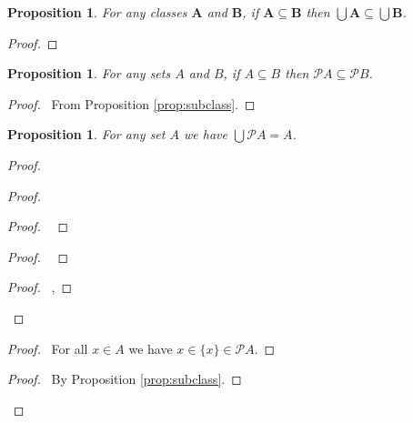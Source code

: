 \documentclass{book}
\let\qed\relax
\newtheorem{prop}[ax]{Proposition}
\theoremstyle{definition}
\begin{document}
\begin{prop}
\label{prop:unionmonotone}
For any classes $\mathbf{A}$ and $\mathbf{B}$, if $\mathbf{A} \subseteq \mathbf{B}$ then $\bigcup \mathbf{A} \subseteq \bigcup \mathbf{B}$.
\end{prop}

\begin{proof}
	\pf
	\qed
\end{proof}

\begin{prop}
\label{prop:powermonotone}
For any sets $A$ and $B$, if $A \subseteq B$ then $\mathcal{P} A \subseteq \mathcal{P} B$.
\end{prop}

\begin{proof}
\pf\ From Proposition \ref{prop:subclass}. \qed
\end{proof}

\begin{prop}
\label{prop:UPA}
For any set $A$ we have $\bigcup \mathcal{P} A = A$.
\end{prop}

\begin{proof}
\pf
{}
\begin{proof}
	\begin{proof}
		\pf\ 
	\end{proof}
	\begin{proof}
		\pf\ 
	\end{proof}
	\begin{proof}
		\pf\ , 
	\end{proof}
\end{proof}
\begin{proof}
	\pf\ For all $x \in A$ we have $x \in \{x\} \in \mathcal{P} A$.
\end{proof}
\qedstep
\begin{proof}
	\pf\ By Proposition \ref{prop:subclass}.
\end{proof}
\qed
\end{proof}
\end{document}

